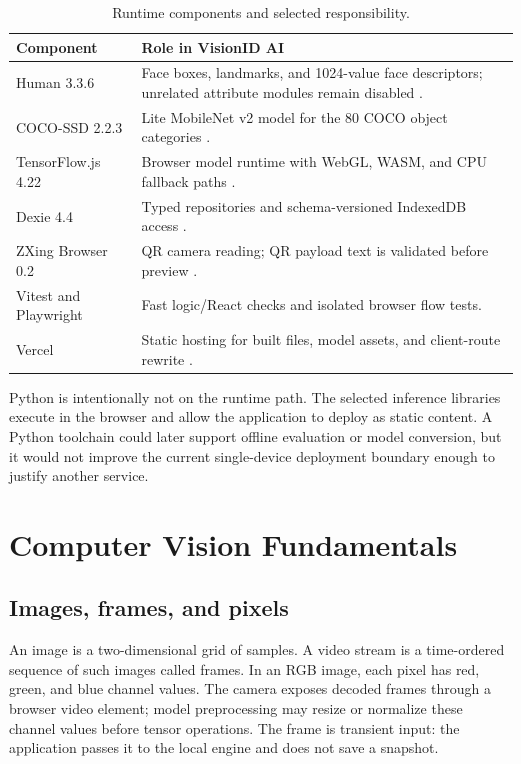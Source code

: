 \documentclass[11pt,oneside,openany]{report}
\begin{document}
\begin{table}[htbp]
\centering
\caption{Runtime components and selected responsibility.}
\begin{tabularx}{\textwidth}{>{\raggedright\arraybackslash}p{}X}
\toprule
\textbf{Component} & \textbf{Role in VisionID AI} \\
\midrule
Human 3.3.6 & Face boxes, landmarks, and 1024-value face descriptors; unrelated attribute modules remain disabled \cite{humanRepo,humanModels}. \\
COCO-SSD 2.2.3 & Lite MobileNet v2 model for the 80 COCO object categories \cite{cocoSsd}. \\
TensorFlow.js 4.22 & Browser model runtime with WebGL, WASM, and CPU fallback paths \cite{tfjs}. \\
Dexie 4.4 & Typed repositories and schema-versioned IndexedDB access \cite{dexie,indexedDb}. \\
ZXing Browser 0.2 & QR camera reading; QR payload text is validated before preview \cite{zxing}. \\
Vitest and Playwright & Fast logic/React checks and isolated browser flow tests. \\
Vercel & Static hosting for built files, model assets, and client-route rewrite \cite{vercelVite}. \\
\bottomrule
\end{tabularx}
\end{table}

Python is intentionally not on the runtime path. The selected inference libraries execute in the browser and allow the application to deploy as static content. A Python toolchain could later support offline evaluation or model conversion, but it would not improve the current single-device deployment boundary enough to justify another service.

\chapter{Computer Vision Fundamentals}
\section{Images, frames, and pixels}
An image is a two-dimensional grid of samples. A video stream is a time-ordered sequence of such images called frames. In an RGB image, each pixel has red, green, and blue channel values. The camera exposes decoded frames through a browser video element; model preprocessing may resize or normalize these channel values before tensor operations. The frame is transient input: the application passes it to the local engine and does not save a snapshot.
\end{document}

